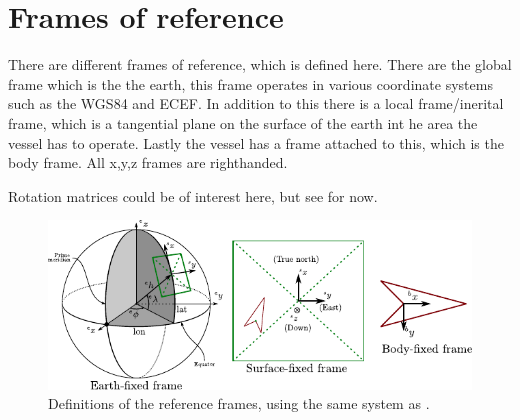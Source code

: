 \section{Frames of reference}
There are different frames of reference, which is defined here. There are the global frame which is the the earth, this frame operates in various coordinate systems such as the \ac{WGS84} and \ac{ECEF}. In addition to this there is a local frame/inerital frame, which is a tangential plane on the surface of the earth int he area the vessel has to operate. Lastly the vessel has a frame attached to this, which is the body frame. All x,y,z frames are righthanded.

Rotation matrices could be of interest here, but see \cite{argo} for now.

\begin{figure}[htbp]
	\centering
	\includegraphics[width=\textwidth]{img/reference_frames}
	\caption{Definitions of the reference frames, using the same system as \cite{argo}.}
	\label{fig:vessel-block-overview}
\end{figure}




